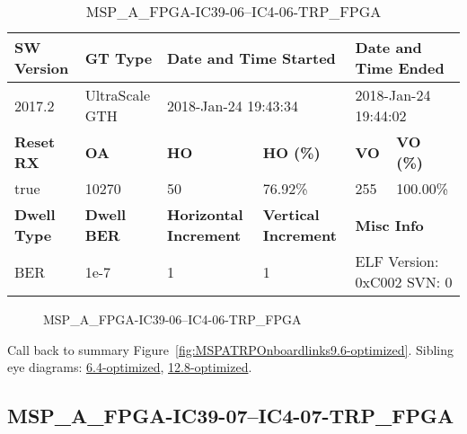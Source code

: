 \begin{table}[h]
\centering
\caption{MSP\_A\_FPGA-IC39-06--IC4-06-TRP\_FPGA}
\label{tab:MSPAFPGAIC3906IC406TRPFPGA9.6-optimized}
\begin{tabular}{@{}|l|l|l|l|l|l|@{}}
\toprule
\textbf{SW Version}                & \textbf{GT Type}   & \multicolumn{2}{l|}{\textbf{Date and Time Started}}            & \multicolumn{2}{l|}{\textbf{Date and Time Ended}}        \\ \midrule
2017.2                       & UltraScale GTH          & \multicolumn{2}{l|}{2018-Jan-24 19:43:34}                   & \multicolumn{2}{l|}{2018-Jan-24 19:44:02}               \\ \midrule
\textbf{Reset RX}                  & \textbf{OA} & \textbf{HO}   & \textbf{HO (\%)} & \textbf{VO} & \textbf{VO (\%)} \\ \midrule
true & 10270        & 50          & 76.92\%        & 255        & 100.00\%       \\ \midrule
\textbf{Dwell Type}                & \textbf{Dwell BER} & \textbf{Horizontal Increment} & \textbf{Vertical Increment}    & \multicolumn{2}{l|}{\textbf{Misc Info}}                  \\ \midrule
BER                            & 1e-7        & 1        & 1           & \multicolumn{2}{l|}{ELF Version: 0xC002 SVN: 0}                         \\ \bottomrule
\end{tabular}
\end{table}

\begin{figure}[h]
\caption{MSP\_A\_FPGA-IC39-06--IC4-06-TRP\_FPGA} \label{fig:MSPAFPGAIC3906IC406TRPFPGA9.6-optimized}
\end{figure}

Call back to summary Figure~\ref{fig:MSPATRPOnboardlinks9.6-optimized}.
Sibling eye diagrams: \hyperref[sec:MSPAFPGAIC3906IC406TRPFPGA6.4-optimized]{6.4-optimized}, \hyperref[sec:MSPAFPGAIC3906IC406TRPFPGA12.8-optimized]{12.8-optimized}.

\clearpage
\newpage


\subsection{MSP\_A\_FPGA-IC39-07--IC4-07-TRP\_FPGA}\label{sec:MSPAFPGAIC3907IC407TRPFPGA9.6-optimized}

